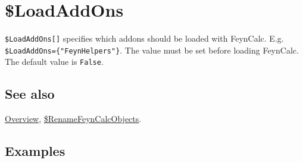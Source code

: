 \documentclass[../FeynCalcManual.tex]{subfiles}
\begin{document}
\hypertarget{dollarloadaddons}{
\section{\$LoadAddOns}\label{dollarloadaddons}}

\texttt{\$LoadAddOns[\allowbreak{}]} specifies which addons should be
loaded with FeynCalc. E.g.
\texttt{\$LoadAddOns=\{\allowbreak{}"FeynHelpers"\}}. The value must be
set before loading FeynCalc. The default value is \texttt{False}.

\subsection{See also}

\hyperlink{toc}{Overview},
\hyperlink{dollarrenamefeyncalcobjects}{\$RenameFeynCalcObjects}.

\subsection{Examples}
\end{document}
